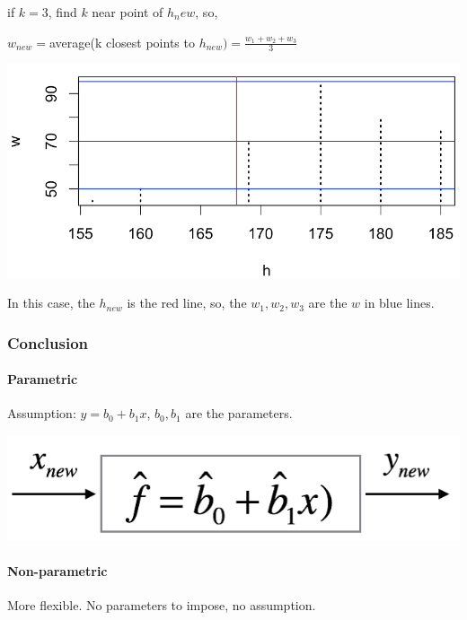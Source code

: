 \documentclass{article}
\begin{document}
{{{{            if $k=3$, find $k$ near point of $h_new$, so,\\
            \begin{center}{
                \(w_{new}=\)average(k closest points to \(h_{new})=\frac{w_1+w_2+w_3}{3}\)
            }
            \end{center}

            \begin{center}{
                \includegraphics[scale=0.5]{knn.png}
            }
            \end{center}

            In this case, the $h_{new}$ is the red line, so, the $w_1, w_2, w_3$ are the $w$ in blue lines.      
        }
        \subsubsection{Conclusion}{
            \paragraph{Parametric}{
                Assumption: $y = b_0 + b_1 x$, $b_0, b_1$ are the parameters.\\
                \begin{center}{
                    \includegraphics[scale=0.5]{parametric.png}
                }
                \end{center}
            }
            \paragraph{Non-parametric}{
                More flexible. No parameters to impose, no assumption. 
            }
        }
    }
}}
\end{document}
